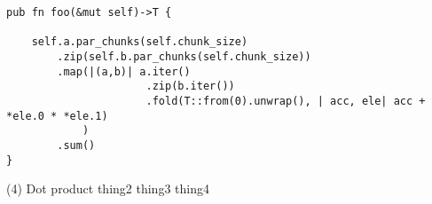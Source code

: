 \documentclass[11pt]{article} %
\begin{document}
\newsavebox\myboxc
\begin{lrbox}{\myboxc}
  \begin{minipage}{\textwidth}
    \begin{lstlisting}
pub fn foo(&mut self)->T {

    self.a.par_chunks(self.chunk_size)
        .zip(self.b.par_chunks(self.chunk_size))
        .map(|(a,b)| a.iter()
                      .zip(b.iter())
                      .fold(T::from(0).unwrap(), | acc, ele| acc + *ele.0 * *ele.1)
            )
        .sum()
}
\end{lstlisting}
\end{minipage}
\end{lrbox}

\begin{question}

\noindent\usebox\myboxc

\begin{tasks}(4)
  \task Dot product
  \task thing2
  \task thing3
  \task thing4
\end{tasks}

\end{question}
\end{document}
